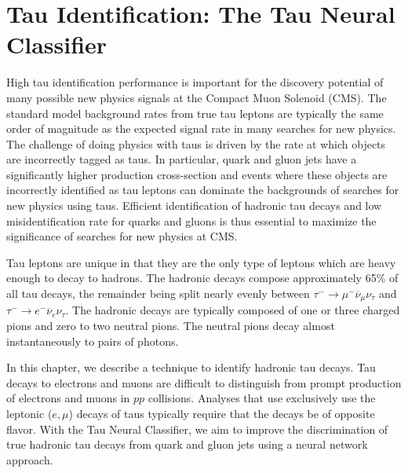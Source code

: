 \ifx\master\undefined\fi

\chapter{Tau Identification: The Tau Neural Classifier}
\label{ch:tanc}
%
High tau identification performance is important for the discovery potential of
many possible new physics signals at the Compact Muon Solenoid (CMS).  The
standard model background rates from true tau leptons are typically the same
order of magnitude as the expected signal rate in many searches for new
physics.  The challenge of doing physics with taus is driven by the rate at
which objects are incorrectly tagged as taus.  In particular, quark and gluon
jets have a significantly higher production cross-section and events where
these objects are incorrectly identified as tau leptons can dominate the
backgrounds of searches for new physics using taus.  Efficient identification
of hadronic tau decays and low misidentification rate for quarks and gluons
is thus essential to maximize the significance of searches for new physics at
CMS.

Tau leptons are unique in that they are the only type of leptons which are heavy
enough to decay to hadrons.  The hadronic decays compose approximately 65\% of
all tau decays, the remainder being split nearly evenly between $\tau^{-} \to
\mu^{-} \overline \nu_\mu \nu_\tau$ and $\tau^{-} \to e^{-} \overline \nu_e \nu_\tau$.
The hadronic decays are typically composed of one or three charged pions and
zero to two neutral pions.  The neutral pions decay almost instantaneously to
pairs of photons.

In this chapter, we describe a technique to identify hadronic tau decays.  Tau
decays to electrons and muons are difficult to distinguish from prompt
production of electrons and muons in $pp$ collisions.  Analyses that use
exclusively use the leptonic ($e,\mu$) decays of taus typically require that the
decays be of opposite flavor.  With the Tau Neural Classifier, we aim to improve
the discrimination of true hadronic tau decays from quark and gluon jets using a
neural network approach.

